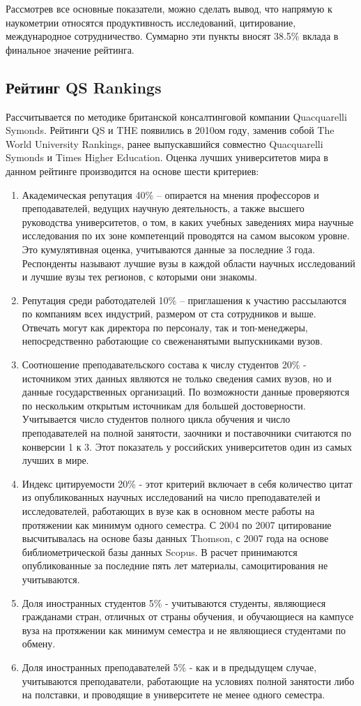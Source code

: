 Рассмотрев все основные показатели, можно сделать вывод, что напрямую к наукометрии относятся
продуктивность исследований, цитирование, международное сотрудничество. Суммарно
эти пункты вносят 38.5\% вклада в финальное значение рейтинга.

\subsection{Рейтинг QS Rankings}
Рассчитывается по методике британской консалтинговой компании Quacquarelli Symonds.
Рейтинги QS и THE появились в 2010ом году, заменив собой The World University Rankings,
ранее выпускавшийся совместно Quacquarelli Symonds и Times Higher Education.
Оценка лучших университетов мира в данном рейтинге производится на основе шести критериев:
\begin{enumerate}
\item Академическая репутация 40\% – опирается на мнения профессоров и преподавателей, ведущих научную деятельность, а также высшего руководства университетов, о том, в каких учебных заведениях мира научные исследования по их зоне компетенций проводятся на самом высоком уровне. Это кумулятивная оценка, учитываются данные за последние 3 года. Респонденты называют лучшие вузы в каждой области научных исследований и лучшие вузы тех регионов, с которыми они знакомы.
\item Репутация среди работодателей 10\% – приглашения к участию рассылаются по компаниям всех индустрий, размером от ста сотрудников и выше. Отвечать могут как директора по персоналу, так и топ-менеджеры, непосредственно работающие со свеженанятыми выпускниками вузов.
\item Соотношение преподавательского состава к числу студентов 20\% - источником этих данных являются не только сведения самих вузов, но и данные государственных организаций. По возможности данные проверяются по нескольким открытым источникам для большей достоверности. Учитывается число студентов полного цикла обучения и число преподавателей на полной занятости, заочники и поставочники считаются по конверсии 1 к 3. Этот показатель у российских университетов один из самых лучших в мире.
\item Индекс цитируемости 20\% - этот критерий включает в себя количество цитат из опубликованных научных исследований на число преподавателей и исследователей, работающих в вузе как в основном месте работы на протяжении как минимум одного семестра. С 2004 по 2007 цитирование высчитывалась на основе базы данных Thomson, с 2007 года на основе библиометрической базы данных Scopus. В расчет принимаются опубликованные за последние пять лет материалы, самоцитирования не учитываются.
\item Доля иностранных студентов 5\% - учитываются студенты, являющиеся гражданами стран, отличных от страны обучения, и обучающиеся на кампусе вуза на протяжении как минимум семестра и не являющиеся студентами по обмену.
\item Доля иностранных преподавателей 5\% - как и в предыдущем случае, учитываются преподаватели, работающие на условиях полной занятости либо на полставки, и проводящие в университете не менее одного семестра.
\end{enumerate}

